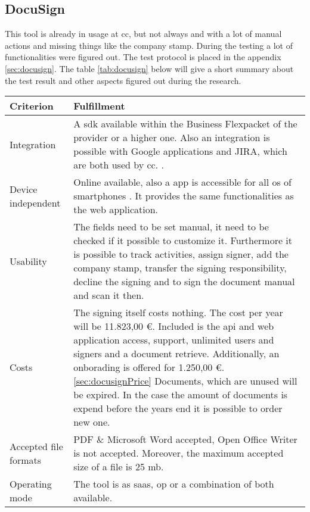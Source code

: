 \subsection{DocuSign}
This tool is already in usage at \gls{cc}, but not always and with a lot of manual actions and missing things like the company stamp. During the testing a lot of functionalities were figured out. The test protocol is placed in the appendix \ref{sec:docusign}. The table \ref{tab:docusign} below will give a short summary about the test result and other aspects figured out during the research.

	
	\begin{longtable}{|p{4cm}|p{10cm}|} \hline
		Criterion & Fulfillment \\ \hline
		Integration &  A \gls{sdk} available within the \grqq Business Flex\grqq packet of the provider or a higher one. Also an integration is possible with Google applications and JIRA, which are both used by \gls{cc}. \parencite{docusign2018integration,docusign2018formats,docusign2018google,docusign2018jira}. \\ \hline
		Device independent & Online available, also a \gls{app} is accessible for all \gls{os} of smartphones \parencite{docusign2018mobile}. It provides the same functionalities as the web application. \\ \hline
		Usability &  The fields need to be set manual, it need to be checked if it possible to customize it. Furthermore it is possible to track activities, assign signer, add the company stamp, transfer the signing responsibility, decline the signing and to sign the document manual and scan it then. \\ \hline
		Costs & The signing itself costs nothing. The cost per year will be 11.823,00 \euro. Included is the \gls{api} and web application access, support, unlimited users and signers and a document retrieve. Additionally, an onborading is offered for 1.250,00 \euro. \ref{sec:docusignPrice} Documents, which are unused will be expired. In the case the amount of documents is expend before the years end it is possible to order new one. \\ \hline
		Accepted file formats & PDF \& Microsoft Word accepted, Open Office Writer is not accepted. Moreover, the maximum accepted size of a file is 25 \gls{mb}. \parencite{docusign2018formats}\\ \hline
		Operating mode & The tool is as \gls{saas}, \gls{op} or a combination of both available. \parencite{docusign2018op,docusign2018saas} \\ \hline

\end{longtable}

